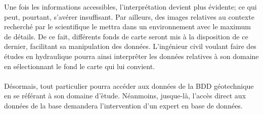 \par
Une fois les informations accessibles, l'interprétation devient 
plus évidente; ce qui peut, pourtant, s'avérer insuffisant. Par 
ailleurs, des images relatives au contexte recherché par le scientifique 
le mettra dans un environnement avec le maximum de détails. De ce fait, 
différents fonds de carte seront mis 
à la disposition de ce dernier, facilitant sa manipulation des données. 
L'ingénieur civil voulant faire des études en hydraulique pourra ainsi 
interprêter les données relatives à son domaine en sélectionnant 
le fond le carte qui lui convient.
\paragraph{}
Désormais, tout particulier pourra accéder aux données de la BDD 
géotechnique en se référant à son domaine d'ètude. Néanmoins, jusque-là,
l'accès direct aux données de la base demandera l'intervention d'un 
expert en base de données.